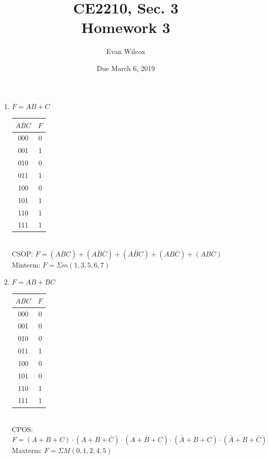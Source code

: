 \documentclass[a4paper]{article}
\title{CE2210, Sec. 3 \\Homework 3}
\author{Evan Wilcox}
\date{Due March 6, 2019}
\begin{document}
    \maketitle

    \begin{enumerate}
        
        \item $F = AB + C$ \\ 
        
        \begin{tabular}{ c|c }
            $ABC$ & $F$ \\ \hline
            000 & 0 \\
            001 & 1 \\
            010 & 0 \\
            011 & 1 \\ \hline
            100 & 0 \\
            101 & 1 \\
            110 & 1 \\
            111 & 1 \\
        \end{tabular} \\

        CSOP: $F = (\bar{A}\bar{B}C) + (A\bar{B}\bar{C}) + (A\bar{B}C) + (AB\bar{C}) + (ABC)$ \\
        Minterm: $F=\Sigma m(1, 3, 5, 6, 7)$ 

        \vspace{2em}

        \item $F = AB + BC$ \\ 
        
        \begin{tabular}{ c|c }
            $ABC$ & $F$ \\ \hline
            000 & 0 \\
            001 & 0 \\
            010 & 0 \\
            011 & 1 \\ \hline
            100 & 0 \\
            101 & 0 \\
            110 & 1 \\
            111 & 1 \\
        \end{tabular} \\

        CPOS: $F = (A+B+C) \cdot (A+B+\bar{C}) \cdot (A+\bar{B}+C) \cdot (\bar{A}+B+C) \cdot (\bar{A}+B+\bar{C})$ \\
        Maxterm: $F=\Sigma M(0, 1, 2, 4, 5)$ \\


\end{enumerate}
\end{document}
